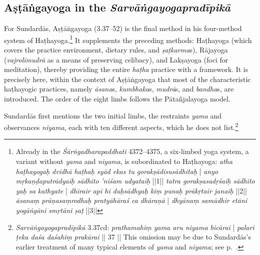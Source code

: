 \subsection{Aṣṭāṅgayoga in the \textit{Sarvāṅgayogapradīpikā}}

For Sundardās, Aṣṭāṅgayoga (3.37–52) is the final method in his four-method system of Haṭhayoga.\footnote{Already in the \emph{Śārṅgadharapaddhati} 4372–4375, a six-limbed yoga system, a variant without \textit{yama} and \textit{niyama}, is subordinated to Haṭhayoga: \textit{atha haṭhayogaḥ dvidhā haṭhaḥ syād ekas tu gorakṣādisusādhitaḥ} | \textit{anyo mṛkaṇḍaputrādyaiḥ sādhito 'niśam udyataiḥ} ||1|| \textit{tatra gorakṣasadṛśaiḥ sādhito yaḥ sa kathyate} | \textit{dhīrair api hi duḥsādhyaḥ kiṃ punaḥ prākṛtair janaiḥ} ||2|| \textit{āsanaṃ prāṇasaṃrodhaḥ pratyāhāraś ca dhāraṇā} | \textit{dhyānaṃ samādhir etāni yogāṅgāni smṛtāni ṣaṭ} ||3||} It supplements the preceding methods: Haṭhayoga (which covers the practice environment, dietary rules, and \textit{ṣaṭkarma}s), Rājayoga (\textit{vajrolīmudrā} as a means of preserving celibacy), and Lakṣayoga (foci for meditation), thereby providing the entire \textit{haṭha} practice with a framework. It is precisely here, within the context of Aṣṭāṅgayoga that most of the characteristic haṭhayogic practices, namely \textit{āsana}s, \textit{kumbhaka}s, \textit{mudrā}s, and \textit{bandha}s, are introduced. The order of the eight limbs follows the Pātañjalayoga model.

Sundardās first mentions the two initial limbs, the restraints \textit{yama} and observances \textit{niyama}, each with ten different aspects, which he does not list.\footnote{\textit{Sarvāṅgayogapradīpikā} 3.37cd: \textit{prathamahiṃ yama aru niyama bicārai} | \textit{palari ṭeka daśa daśahiṃ prakārai} || 37 || This omission may be due to Sundardās's earlier treatment of many typical elements of \textit{yama} and \textit{niyama}; see p.~\pageref{sarvangabhakti}.}

